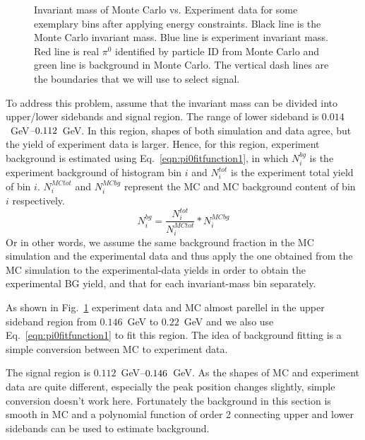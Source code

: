 \begin{figure}[H]
  \caption{Invariant mass of Monte Carlo vs. Experiment data for some exemplary bins after applying energy constraints. Black line is the Monte Carlo invariant mass. Blue line is experiment invariant mass. Red line is real $\pi^0$ identified by particle ID from Monte Carlo and green line is background in Monte Carlo. The vertical dash lines are the boundaries that we will use to select signal.}
  \label{fig:pi0MC_Exp}
\end{figure}
To address this problem, assume that the invariant mass can be divided into upper/lower sidebands and signal region. The range of lower sideband is $0.014$~GeV$\textup{--}0.112$~GeV. In this region, shapes of both simulation and data agree, but the yield of experiment data is larger. Hence, for this region, experiment background is estimated using Eq.~\eqref{eqn:pi0fitfunction1}, in which $N_i^{bg}$ is the experiment background of histogram bin $i$ and $N_i^{tot}$ is the experiment total yield of bin $i$. $N_i^{MCtot}$ and $N_i^{MCbg}$ represent the MC and MC background content of bin $i$ respectively.  
\begin{equation}
N_i^{bg}=\frac{N_i^{tot}}{N_i^{MCtot}}*N_i^{MCbg}
\label{eqn:pi0fitfunction1}
\end{equation}
Or in other words, we assume the same background fraction in the MC simulation and the experimental data and thus apply the one obtained from the MC simulation to the experimental-data yields in order to obtain the experimental BG yield, and that for each invariant-mass bin separately.

As shown in Fig.~\ref{fig:pi0MC_Exp} experiment data and MC almost parellel in the upper sideband region from $0.146$~GeV to $0.22$~GeV and we also use Eq.~\eqref{eqn:pi0fitfunction1} to fit this region. The idea of background fitting is a simple conversion between MC to experiment data.

The signal region is $0.112$~GeV$\textup{--}0.146$~GeV. As the shapes of MC and experiment data are quite different, especially the peak position changes slightly, simple conversion doesn't work here. Fortunately the background in this section is smooth in MC and a polynomial function of order 2 connecting upper and lower sidebands can be used to estimate background.

